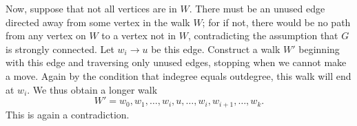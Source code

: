 \documentclass[12pt]{article}
\begin{document}
\begin{enumerate}[(a)]
{        Now, suppose that not all vertices are in $W$. There must be an unused edge directed away from some vertex in the walk $W$; for if not, there would be no path from any vertex on $W$ to a vertex not in $W$, contradicting the assumption that $G$ is strongly connected.  
        Let $w_i \to u$ be this edge. Construct a walk $W'$ beginning with this edge and traversing only unused edges, stopping when we cannot make a move. Again by the condition that indegree equals outdegree, this walk will end at $w_i$. We thus obtain a longer walk 
        \[ W' = w_0, w_1, \ldots, w_i, u, \ldots, w_i, w_{i+1}, \ldots, w_k. \]
        This is again a contradiction.

    }

\end{enumerate}
\end{document}
